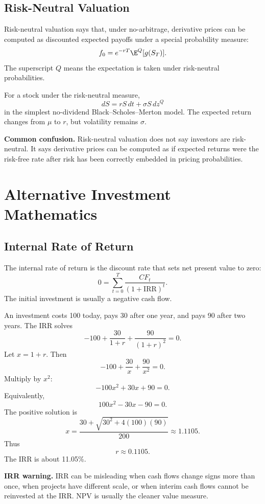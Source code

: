 \subsection{Risk-Neutral Valuation}

Risk-neutral valuation says that, under no-arbitrage, derivative prices can be
computed as discounted expected payoffs under a special probability measure:
\[
    f_0=e^{-rT}\E^Q[g(S_T)].
\]
The superscript $Q$ means the expectation is taken under risk-neutral
probabilities.

For a stock under the risk-neutral measure,
\[
    dS=rS\,dt+\sigma S\,dz^Q
\]
in the simplest no-dividend Black--Scholes--Merton model. The expected return
changes from $\mu$ to $r$, but volatility remains $\sigma$.

\begin{boxF}
\textbf{Common confusion.} Risk-neutral valuation does not say investors are
risk-neutral. It says derivative prices can be computed as if expected returns
were the risk-free rate after risk has been correctly embedded in pricing
probabilities.
\end{boxF}

\section{Alternative Investment Mathematics}

\subsection{Internal Rate of Return}

The internal rate of return is the discount rate that sets net present value to
zero:
\[
    0=\sum_{t=0}^{T}\frac{CF_t}{(1+\mathrm{IRR})^t}.
\]
The initial investment is usually a negative cash flow.

\begin{exmp}
An investment costs 100 today, pays 30 after one year, and pays 90 after two
years. The IRR solves
\[
    -100+\frac{30}{1+r}+\frac{90}{(1+r)^2}=0.
\]
Let $x=1+r$. Then
\[
    -100+\frac{30}{x}+\frac{90}{x^2}=0.
\]
Multiply by $x^2$:
\[
    -100x^2+30x+90=0.
\]
Equivalently,
\[
    100x^2-30x-90=0.
\]
The positive solution is
\[
    x=\frac{30+\sqrt{30^2+4(100)(90)}}{200}\approx 1.1105.
\]
Thus
\[
    r\approx 0.1105.
\]
The IRR is about 11.05\%.
\end{exmp}

\begin{boxF}
\textbf{IRR warning.} IRR can be misleading when cash flows change signs more
than once, when projects have different scale, or when interim cash flows cannot
be reinvested at the IRR. NPV is usually the cleaner value measure.
\end{boxF}

